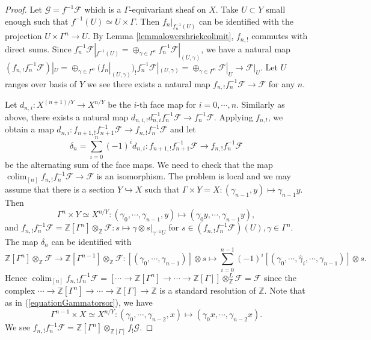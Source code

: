 \documentclass[10pt,a4paper]{amsart}
\DeclareMathOperator{\colim}{colim}
\def\bbZ{\mathbb{Z}}
\def\sF{{\mathscr{F}}}
\def\sG{{\mathscr{G}}}
\begin{document}
\begin{proof}
	Let $\sG=f^{-1}\sF$ which is a $\Gamma$-equivariant sheaf on $X$. Take $U\subset Y$ small enough such that $f^{-1}(U)\simeq U\times \Gamma$. Then $f_n|_{f_n^{-1}(U)}$ can be identified with the projection $U\times \Gamma^n\rightarrow U$. By Lemma \ref{lemmalowershriekcolimit}, $f_{n,!}$ commutes with direct sums. Since $f_n^{-1}\sF|_{f^{-1}(U)}=\oplus_{\gamma\in \Gamma^{n}}f_n^{-1}\sF|_{(U,\gamma)}$, we have a natural map $(f_{n,!}f_n^{-1}\sF)|_{U}=\oplus_{\gamma\in \Gamma^{n}}(f_{n}|_{(U,\gamma)})_{!}f_{n}^{-1}\sF|_{(U,\gamma)}=\oplus_{\gamma\in \Gamma^{n}}\sF|_{U}\rightarrow \sF|_U$. Let $U$ ranges over basis of $Y$ we see there exists a natural map $f_{n,!}f_n^{-1}\sF\rightarrow \sF$ for any $n$.
	
	Let $d_{n,i}:X^{(n+1)/Y}\rightarrow X^{n/Y}$ be the $i$-th face map for $i=0,\cdots,n$. Similarly as above, there exists a natural map $ d_{n,i,!}d_{n,i}^{-1}f_{n}^{-1}\sF\rightarrow f_{n}^{-1}\sF$. Applying $f_{n,!}$, we obtain a map $d_{n,i}:f_{n+1,!}f_{n+1}^{-1}\sF\rightarrow f_{n,!}f_{n}^{-1}\sF$ and let
	\[ \delta_{n}=\sum_{i=0}^n(-1)^id_{n,i}: f_{n+1,!}f_{n+1}^{-1}\sF\rightarrow f_{n,!}f_{n}^{-1}\sF\]
    be the alternating sum of the face maps. We need to check that the map $\colim_{[n]}f_{n,!}f_{n}^{-1}\sF\rightarrow \sF$ is an isomorphism. The problem is local and we may assume that there is a section $Y\hookrightarrow X$ such that $\Gamma\times Y=X:(\gamma_{n-1},y)\mapsto \gamma_{n-1}y$. 
	Then
	\begin{equation}\label{equationGammatorsor}
		\Gamma^{n}\times Y\simeq X^{n/Y}:(\gamma_0,\cdots,\gamma_{n-1},y)\mapsto (\gamma_0y,\cdots,\gamma_{n-1}y),
   \end{equation}  
	and $f_{n,!}f_{n}^{-1}\sF=\bbZ[\Gamma^n]\otimes_{\bbZ}\sF: s\mapsto \gamma\otimes s|_{\gamma^{-1}U}$ for $s\in (f_{n,!}f_{n}^{-1}\sF)(U),\gamma\in\Gamma^n$.
	The map $\delta_n$ can be identified with 
	\[\bbZ[\Gamma^{n}]\otimes_{\bbZ}\sF\rightarrow \bbZ[\Gamma^{n-1}]\otimes_{\bbZ}\sF: [(\gamma_0,\cdots, \gamma_{n-1})]\otimes s\mapsto\sum_{i=0}^{n-1}(-1)^i [(\gamma_0,\cdots,\widehat{\gamma}_{i},\cdots,\gamma_{n-1})]\otimes s.\]
	Hence $\colim_{[n]}f_{n,!}f_{n}^{-1}\sF=[\cdots\rightarrow\bbZ[\Gamma^n]\rightarrow \cdots\rightarrow \bbZ[\Gamma]]\otimes^L_{\bbZ}\sF=\sF$ since the complex $\cdots\rightarrow\bbZ[\Gamma^n]\rightarrow \cdots\rightarrow \bbZ[\Gamma]\rightarrow \bbZ$
    is a standard resolution of $\bbZ$. Note that as in (\ref{equationGammatorsor}), we have
	\[\Gamma^{n-1}\times X\simeq X^{n/Y}:(\gamma_0,\cdots,\gamma_{n-2},x)\mapsto (\gamma_0x,\cdots,\gamma_{n-2}x).\]
	We see $f_{n,!}f_n^{-1}\sF=\bbZ[\Gamma^n]\otimes_{\bbZ[\Gamma]}f_!\sG$.
\end{proof} 
\end{document}
